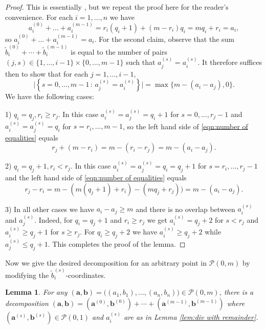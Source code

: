 \documentclass[12pt]{amsart}
\newcommand{\aaa}{\mathbf{a}}
\newcommand{\bbb}{\mathbf{b}}
\numberwithin{equation}{section}
\newtheorem{lemma}[theorem]{Lemma}
\theoremstyle{definition}
\begin{document}
\begin{proof}
    This is essentially \cite[Lemma 6.20]{GKO}, but we repeat the proof here for the reader's convenience. For each $i=1,\dots,n$ we have
    $$
    a^{(0)}_i+\ldots+a^{(m-1)}_i=r_i(q_i+1)+(m-r_i)q_i=mq_i+r_i=a_i,
    $$
    so $a^{(0)}_i+\ldots+a^{(m-1)}_i = a_i$. For the second claim, observe that the sum $\tilde{b}^{(0)}_i+\cdots+\tilde{b}^{(m-1)}_i$ is equal to the number of pairs $(j,s)\in \{1,\dots,i-1\}\times\{0,\dots,m-1\}$ such that $a_j^{(s)}=a_i^{(s)}$. It therefore suffices then to show that for each  $j=1,\dots,i-1$, 
    \begin{equation}\label{eqn:number of equalities}
        \big|\left\{s = 0,\dots,m-1 \, : \, a^{(s)}_j = a^{(s)}_i \right\} \big| = \max\{m-(a_i-a_j),0\}. 
    \end{equation}
    We have the following cases:
    
    1) $q_i=q_j,r_i\ge r_j$. In this case $a_i^{(s)}=a_{j}^{(s)}=q_i+1$ for $s=0,\ldots,r_j-1$ and $a_i^{(s)}=a_{j}^{(s)}=q_i$  for $s=r_i,\ldots,m-1$, so the left hand side of \eqref{eqn:number of equalities} equals
    $$
    r_j+(m-r_i)=m-(r_i-r_j)=m-(a_i-a_j).
    $$
    
    
    2) $q_i=q_j+1,r_i<r_j$. In this case 
    $a_i^{(s)}=a_{j}^{(s)}=q_i=q_j+1$ for $s=r_i,\ldots,r_j-1$ and the left hand side of \eqref{eqn:number of equalities} equals
    $$
    r_j-r_i=m-(m(q_j+1)+r_i)-(mq_j+r_j))=m-(a_i-a_j).
    $$
    
    3) In all other cases we have $a_i-a_j\ge m$ and there is no overlap between $a_i^{(s)}$ and $a_j^{(s)}$. Indeed, for $q_i=q_j+1$ and $r_i\ge r_j$ we get $a_i^{(s)}=q_j+2$ for $s<r_j$ and $a_i^{(s)}\ge q_j+1$ for $s\ge r_j$. 
    For $q_i\ge q_j+2$ we have $a_i^{(s)}\ge q_j+2$ while $a_j^{(s)}\le q_j+1$. This completes the proof of the lemma.
\end{proof}

Now we give the desired decomposition for an arbitrary point in $\mathcal{P}(0,m)$ by modifying the $\widetilde{b}_i^{(s)}$-coordinates.

\begin{lemma}\label{lem:k=0 decomp}
    For any $(\aaa,\bbb) = \big( (a_1,b_1),\dots,(a_n,b_n) \big)\in \mathcal{P}(0,m)$, there is a decomposition $(\aaa,\bbb) = \left(\aaa^{(0)},\bbb^{(0)}\right)+\cdots+\left(\aaa^{(m-1)},\bbb^{(m-1)}\right)$ where $\left(\aaa^{(s)},\bbb^{(s)}\right)\in \mathcal{P}(0,1)$ and $a_i^{(s)}$ are as in Lemma \ref{lem:div with remainder}.
\end{lemma}
\end{document}
